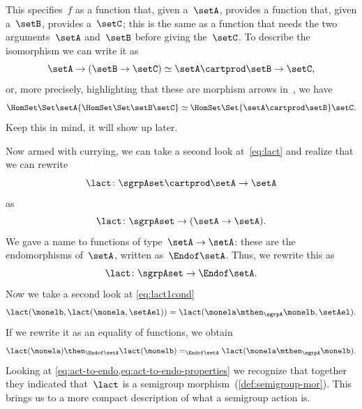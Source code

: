 This specifies~$f$ as a function that, given a~$\setA$, provides a function that, given a~$\setB$, provides a~$\setC$;
this is the same as a function that needs the two arguments~$\setA$ and~$\setB$ before giving the~$\setC$.
To describe the isomorphism we can write it as
\begin{equation}
    \label{eq:currying-iso-1}
    \setA \to ( \setB \to \setC) \simeq  \setA \cartprod \setB \to \setC,
\end{equation}
or, more precisely, highlighting that these are morphism arrows in~\Set, we have
\begin{equation}
    \label{eq:currying-iso-2}
    \HomSet\Set\setA{\HomSet\Set\setB\setC} \simeq \HomSet\Set{\setA \cartprod \setB}\setC.
\end{equation}
Keep this in mind, it will show up later.

Now armed with currying, we can take a second look at~\cref{eq:lact} and realize that we can rewrite
\begin{equation}
    \label{eq:currying-lact-1}
    \lact \colon \sgrpAset \cartprod \setA \to \setA
\end{equation}
as
\begin{equation}
    \label{eq:currying-lact-2}
    \lact \colon \sgrpAset \to (\setA \to \setA).
\end{equation}
%
We gave a name to functions of type~$\setA \to \setA$: these are the endomorphisms of~$\setA$, written as~$\Endof\setA$.
Thus, we rewrite this as
%
\begin{equation}
    \label{eq:act-to-endo}
    \lact \colon \sgrpAset \to \Endof\setA.
\end{equation}
%
Now we take a second look at \cref{eq:lact1cond}
%
\begin{equation}
    \label{eq:lact1cond-2}
    \lact(\monelb, \lact(\monela, \setAel)) = \lact(\monela \mthen_\sgrpA \monelb, \setAel).
\end{equation}
%
If we rewrite it as an equality of functions, we obtain
%
\begin{equation}
    \label{eq:act-to-endo-properties}
    \lact(\monela) \then_{\Endof\setA}  \lact(\monelb) =_{\Endof\setA} \lact(\monela \mthen_\sgrpA \monelb).
\end{equation}
%
Looking at \cref{eq:act-to-endo,eq:act-to-endo-properties} we recognize that together
they indicated that~$\lact$ is a semigroup morphism~(\cref{def:semigroup-mor}).
This brings us to a more compact description of what a semigroup action is.

